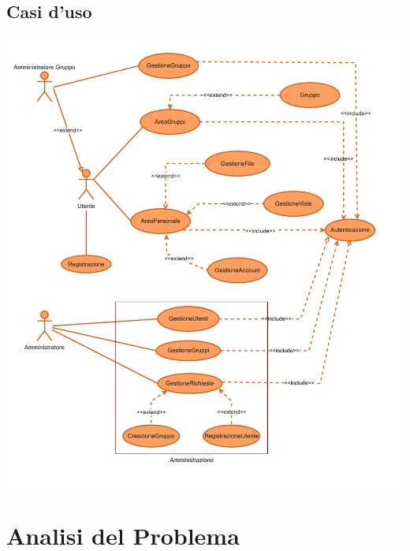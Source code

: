 \documentclass[a4paper,11pt,oneside]{book}
\begin{document}
\newpage
\tableofcontents


\pagebreak


\pagebreak


\pagebreak


\pagebreak

\section*{Casi d'uso}
\begin{adjustwidth}{-2cm}{0cm}
\includegraphics[scale=0.9]{casi d'uso/Casi d'uso-Casi d'uso.drawio.pdf}
\end{adjustwidth}


\pagebreak


\pagebreak

\chapter*{Analisi del Problema}









\end{document}
